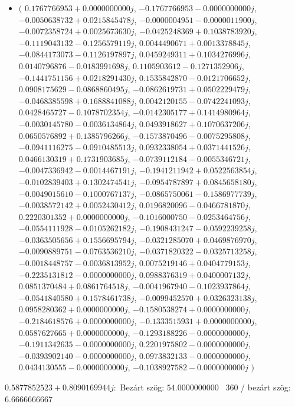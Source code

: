 \documentclass[14pt,a4paper]{article}
\begin{document}
\begin{itemize}
\item
$\big($
$0.1767766953+0.0000000000j$, $-0.1767766953-0.0000000000j$, $-0.0050638732+0.0215845478j$, $-0.0000004951-0.0000011900j$, $-0.0072358724+0.0025673630j$, $-0.0425248369+0.1038783920j$, $-0.1119043132-0.1256579119j$, $0.0044490671+0.0013378845j$, $-0.0844173073-0.1126197897j$, $0.0459249311+0.1034276996j$, $0.0140796876-0.0183991698j$, $0.1105903612-0.1271352906j$, $-0.1441751156+0.0218291430j$, $0.1535842870-0.0121706652j$, $0.0908175629-0.0868860495j$, $-0.0862619731+0.0502229479j$, $-0.0468385598+0.1688841088j$, $0.0042120155-0.0742241093j$, $0.0428465727-0.1078702354j$, $-0.0142305177+0.1414980964j$, $-0.0030145780-0.0036134864j$, $0.0493918627+0.1070637206j$, $0.0650576892+0.1385796266j$, $-0.1573870496-0.0075295808j$, $-0.0941116275-0.0910485513j$, $0.0932338054+0.0371441526j$, $0.0466130319+0.1731903685j$, $-0.0739112184-0.0055346721j$, $-0.0047336942-0.0014467191j$, $-0.1941211942+0.0522563854j$, $-0.0102839403+0.1302474541j$, $-0.0954787897+0.0845658180j$, $-0.0049015610-0.1000767137j$, $-0.0865750061-0.1586977739j$, $-0.0038572142+0.0052430412j$, $0.0196820096-0.0466781870j$, $0.2220301352+0.0000000000j$, $-0.1016000750-0.0253464756j$, $-0.0554111928-0.0105262182j$, $-0.1908431247-0.0592239258j$, $-0.0363505656+0.1556695794j$, $-0.0321285070+0.0469876970j$, $-0.0090889751-0.0763536210j$, $-0.0371820322-0.0325713258j$, $-0.0018448757-0.0036813952j$, $0.0075219146+0.0404779153j$, $-0.2235131812-0.0000000000j$, $0.0988376319+0.0400007132j$, $0.0851370484+0.0861764518j$, $-0.0041967940-0.1023937864j$, $-0.0541840580+0.1578461738j$, $-0.0099452570+0.0326323138j$, $0.0958280362+0.0000000000j$, $-0.1580538274+0.0000000000j$, $-0.2184618576+0.0000000000j$, $-0.1333515931+0.0000000000j$, $0.0587627665+0.0000000000j$, $-0.1293188226-0.0000000000j$, $-0.1911342635-0.0000000000j$, $0.2201975802-0.0000000000j$, $-0.0393902140-0.0000000000j$, $0.0973832133-0.0000000000j$, $0.0434130555-0.0000000000j$, $-0.1038927582-0.0000000000j$
$\big)$
\end{itemize}
$0.5877852523+0.8090169944j$:\
Bezárt szög: $54.0000000000$ \
360 / bezárt szög: $6.6666666667$\
\end{document}
